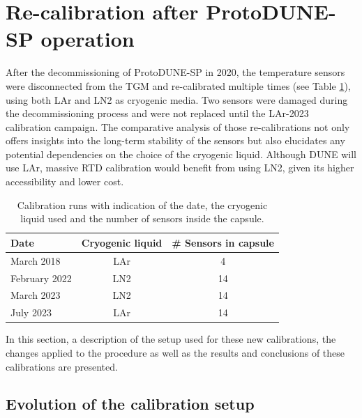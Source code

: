 \section{Re-calibration after ProtoDUNE-SP operation}
\label{sec:new_calib}

\noindent After the decommissioning of ProtoDUNE-SP in 2020, the temperature sensors were disconnected from the TGM and re-calibrated multiple times (see Table \ref{tab:calib}), using both LAr and LN2 as cryogenic media. Two sensors were damaged during the decommissioning process and were not replaced until the LAr-2023 calibration campaign. The comparative analysis of those re-calibrations not only offers insights into the long-term stability of the sensors but also elucidates any potential dependencies on the choice of the cryogenic liquid. Although DUNE will use LAr, massive RTD calibration would benefit from using LN2, given its higher accessibility and lower cost.

\begin{table}[htbp]
\begin{center}
\begin{tabular}{l c c}
Date & Cryogenic liquid & \# Sensors in capsule  \\ \hline
March 2018     &   LAr    &  4  \\
February 2022  &   LN2    & 14  \\
March 2023     &   LN2    & 14  \\
July 2023      &   LAr    & 14  \\
\end{tabular}
\end{center}
\caption{Calibration runs with indication of the date, the cryogenic liquid used and the number of sensors inside the capsule.}
\label{tab:calib}
\end{table}

In this section, a description of the setup used for these new calibrations, the changes applied to the procedure as well as the results and conclusions of these calibrations are presented.

\subsection{Evolution of the calibration setup}
\label{sec:new_calib_setup}

